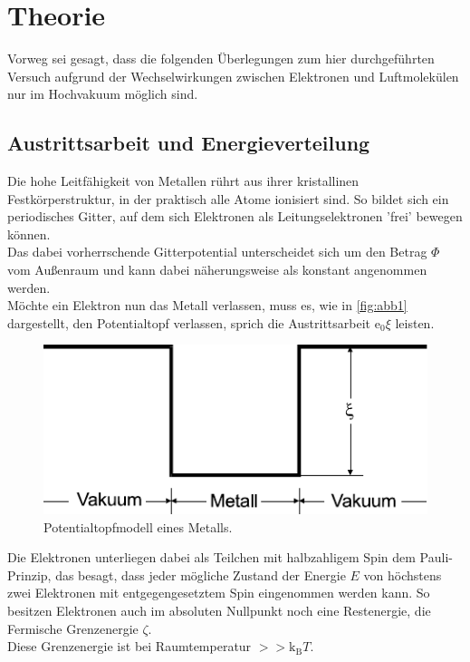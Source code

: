 \section{Theorie}
\label{sec:theorie}

Vorweg sei gesagt, dass die folgenden Überlegungen zum hier
durchgeführten Versuch aufgrund der Wechselwirkungen
zwischen Elektronen und Luftmolekülen
nur im Hochvakuum möglich sind.


\subsection{Austrittsarbeit und Energieverteilung}

Die hohe Leitfähigkeit von Metallen rührt aus ihrer kristallinen
Festkörperstruktur, in der praktisch alle Atome ionisiert sind.
So bildet sich ein periodisches Gitter, auf dem sich Elektronen 
als Leitungselektronen 'frei' bewegen können. \\

Das dabei vorherrschende Gitterpotential unterscheidet sich um
den Betrag $\Phi$ vom Außenraum und kann dabei näherungsweise
als konstant angenommen werden. \\

Möchte ein Elektron nun das Metall verlassen, muss es, wie in
\autoref{fig:abb1} dargestellt, den Potentialtopf verlassen,
sprich die Austrittsarbeit $\text{e}_0 \xi$ leisten. \\

\begin{figure}[H]
    \centering
    \includegraphics{figures/Abb1.pdf}
    \caption{Potentialtopfmodell eines Metalls\cite{ap09}.}
    \label{fig:abb1}
\end{figure}

Die Elektronen unterliegen dabei als Teilchen mit halbzahligem
Spin dem Pauli-Prinzip, das besagt, dass jeder mögliche
Zustand der Energie $E$ von höchstens zwei Elektronen mit
entgegengesetztem Spin eingenommen werden kann.
So besitzen Elektronen auch im absoluten Nullpunkt noch eine Restenergie,
die Fermische Grenzenergie $\zeta$. \\
Diese Grenzenergie ist bei Raumtemperatur $>> \text{k}_\text{B} T$. \\

